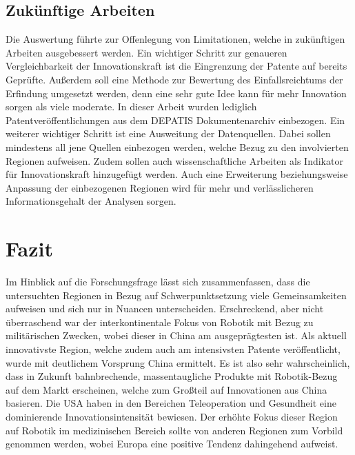 \subsection*{Zukünftige Arbeiten}\label{sec:future_work}
Die Auswertung führte zur Offenlegung von Limitationen, welche in zukünftigen Arbeiten ausgebessert werden. 
Ein wichtiger Schritt zur genaueren Vergleichbarkeit der Innovationskraft ist die Eingrenzung der Patente auf bereits Geprüfte. Außerdem soll eine Methode zur Bewertung des Einfallsreichtums der Erfindung umgesetzt werden, denn eine sehr gute Idee kann für mehr Innovation sorgen als viele moderate. In dieser Arbeit wurden lediglich Patentveröffentlichungen aus dem \ac{DEPATIS} Dokumentenarchiv einbezogen. Ein weiterer wichtiger Schritt ist eine Ausweitung der Datenquellen. Dabei sollen mindestens all jene Quellen einbezogen werden, welche Bezug zu den involvierten Regionen aufweisen. Zudem sollen auch wissenschaftliche Arbeiten als Indikator für Innovationskraft hinzugefügt werden. Auch eine Erweiterung beziehungsweise Anpassung der einbezogenen Regionen wird für mehr und verlässlicheren Informationsgehalt der Analysen sorgen.

\newpage
\section{Fazit}
Im Hinblick auf die Forschungsfrage lässt sich zusammenfassen, dass die untersuchten Regionen in Bezug auf Schwerpunktsetzung viele Gemeinsamkeiten aufweisen und sich nur in Nuancen unterscheiden. Erschreckend, aber nicht überraschend war der interkontinentale Fokus von Robotik mit Bezug zu militärischen Zwecken, wobei dieser in China am ausgeprägtesten ist. 
Als aktuell innovativste Region, welche zudem auch am intensivsten Patente veröffentlicht, wurde mit deutlichem Vorsprung China ermittelt. Es ist also sehr wahrscheinlich, dass in Zukunft bahnbrechende, massentaugliche Produkte mit Robotik-Bezug auf dem Markt erscheinen, welche zum Großteil auf Innovationen aus China basieren. Die USA haben in den Bereichen Teleoperation und Gesundheit eine dominierende Innovationsintensität bewiesen. Der erhöhte Fokus dieser Region auf Robotik im medizinischen Bereich sollte von anderen Regionen zum Vorbild genommen werden, wobei Europa eine positive Tendenz dahingehend aufweist.
